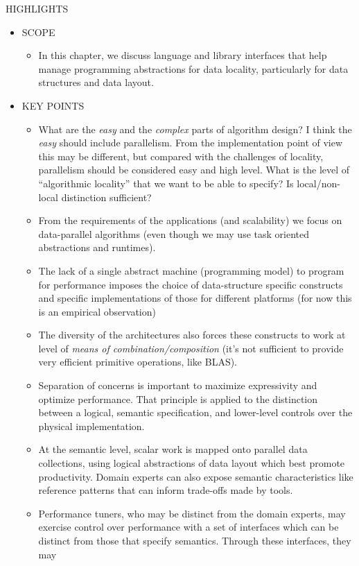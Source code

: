 HIGHLIGHTS
\begin{itemize}
\item SCOPE
  \begin{itemize}
  \item In this chapter, we discuss language and library interfaces that help manage programming abstractions for data locality, particularly for data structures and data layout. 
  \end{itemize}
\item KEY POINTS
  \begin{itemize}
  \item What are the {\em easy} and the {\em complex} parts of algorithm design? I think the {\em easy} should include parallelism. From the implementation point of view this may be different, but compared with the challenges of locality, parallelism should be considered easy and high level. What is the level of ``algorithmic locality'' that we want to be able to specify? Is local/non-local distinction sufficient?
  \item From the requirements of the applications (and scalability) we focus on data-parallel algorithms (even though we may use task oriented abstractions and runtimes).
  \item The lack of a single abstract machine (programming model) to program for performance imposes the choice of data-structure specific constructs and specific implementations of those for different platforms (for now this is an empirical observation)
  \item The diversity of the architectures also forces these constructs to work at level of {\em means of combination/composition} (it's not sufficient to provide very efficient primitive operations, like BLAS).
  \item Separation of concerns is important to maximize expressivity and optimize performance.  That principle is applied to the distinction between a logical, semantic specification, and lower-level controls over the physical implementation.
  \item At the semantic level, scalar work is mapped onto parallel data collections, using logical abstractions of data layout which best promote productivity.  Domain experts can also expose semantic characteristics like reference patterns that can inform trade-offs made by tools.
  \item Performance tuners, who may be distinct from the domain experts, may exercise control over performance with a set of interfaces which can be distinct from those that specify semantics.  Through these interfaces, they may 

\end{itemize}
\end{itemize}
